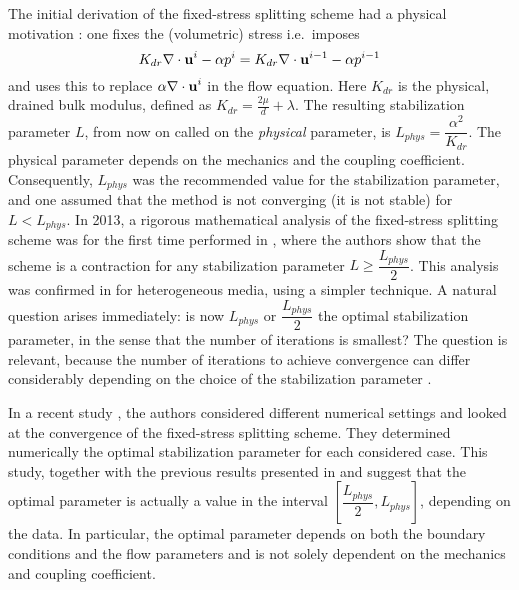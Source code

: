 \documentclass[../Main/main.tex]{subfiles}
\begin{document}
The initial derivation of the fixed-stress splitting scheme had a physical motivation \cite{settari1998,Kim}: one fixes the (volumetric) stress i.e.\ imposes $$K_{dr}{\nabla \cdot \bf u}^i - \alpha p^i = K_{dr} \nabla \cdot {\bf u}^{i-1} - \alpha p^{i-1}$$ and uses this to replace $\alpha {\nabla \cdot \bf u}^i$ in the flow equation. Here $K_{dr}$ is the physical, drained bulk modulus, defined as $K_{dr}=\frac{2\mu}{d}+\lambda$. The resulting stabilization parameter $L$, from now on called on the {\it physical} parameter, is $L_{phys} = \dfrac{\alpha^2} {K_{dr}}$. The physical parameter depends on the mechanics and the coupling coefficient. Consequently, $L_{phys}$ was the recommended value for the stabilization parameter, and one assumed that the method is not converging (it is not stable) for $L < L_{phys}$. In 2013, a rigorous mathematical analysis of the fixed-stress splitting scheme was for the first time performed in \cite{andro}, where the authors show that the scheme is a contraction for any stabilization parameter $L \ge  \dfrac{L_{phys}} {2}$. This analysis was confirmed in \cite{jakubAML} for heterogeneous media, using a simpler technique. A natural question arises immediately: is now $L_{phys}$ or  $\dfrac{L_{phys}} {2}$ the optimal stabilization parameter, in the sense that the number of iterations is smallest? The question is relevant, because the number of iterations to achieve convergence can differ considerably depending on the choice of the stabilization parameter \cite{bause,jakubAML,jakubuwe,mikelicwang}. 

In a recent study \cite{jakubuwe}, the authors considered different numerical settings and looked at the convergence of the fixed-stress splitting scheme. They determined numerically the optimal stabilization parameter for each considered case. This study, together with the previous results presented in \cite{mikelicwang} and \cite{jakubAML} suggest that the optimal parameter is actually a value in the interval $\left[\dfrac{L_{phys}} {2}, L_{phys} \right]$, depending on the data. In particular, the optimal parameter depends on both the boundary conditions and the flow parameters and is not solely dependent on the mechanics and coupling coefficient.
\end{document}
